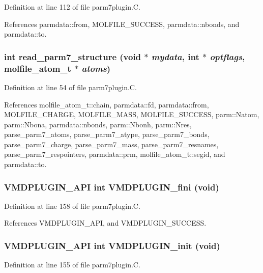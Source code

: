 Definition at line 112 of file parm7plugin.C.

References parmdata::from, MOLFILE\_\-SUCCESS, parmdata::nbonds, and parmdata::to.
\subsubsection{\setlength{\rightskip}{0pt plus 5cm}int read\_\-parm7\_\-structure (void $\ast$ {\em mydata}, int $\ast$ {\em optflags}, {\bf molfile\_\-atom\_\-t} $\ast$ {\em atoms})\hspace{0.3cm}{\tt  [static]}}\label{parm7plugin_8C_a2}




Definition at line 54 of file parm7plugin.C.

References molfile\_\-atom\_\-t::chain, parmdata::fd, parmdata::from, MOLFILE\_\-CHARGE, MOLFILE\_\-MASS, MOLFILE\_\-SUCCESS, parm::Natom, parm::Nbona, parmdata::nbonds, parm::Nbonh, parm::Nres, parse\_\-parm7\_\-atoms, parse\_\-parm7\_\-atype, parse\_\-parm7\_\-bonds, parse\_\-parm7\_\-charge, parse\_\-parm7\_\-mass, parse\_\-parm7\_\-resnames, parse\_\-parm7\_\-respointers, parmdata::prm, molfile\_\-atom\_\-t::segid, and parmdata::to.
\subsubsection{\setlength{\rightskip}{0pt plus 5cm}VMDPLUGIN\_\-API int VMDPLUGIN\_\-fini (void)}\label{parm7plugin_8C_a6}




Definition at line 158 of file parm7plugin.C.

References VMDPLUGIN\_\-API, and VMDPLUGIN\_\-SUCCESS.
\subsubsection{\setlength{\rightskip}{0pt plus 5cm}VMDPLUGIN\_\-API int VMDPLUGIN\_\-init (void)}\label{parm7plugin_8C_a5}




Definition at line 155 of file parm7plugin.C.

